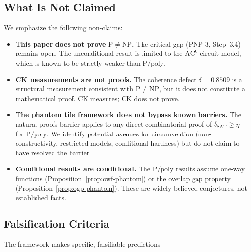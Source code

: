 \documentclass[11pt]{article}
\theoremstyle{definition}
\theoremstyle{remark}
\newcommand{\Ppoly}{\mathrm{P/poly}}
\newcommand{\ACz}{\mathrm{AC}^0}
\newcommand{\dSAT}{\delta_{\mathrm{SAT}}}
\begin{document}
\subsection{What Is Not Claimed}

We emphasize the following non-claims:

\begin{itemize}[nosep]
  \item \textbf{This paper does not prove $\mathrm{P} \neq \mathrm{NP}$.}
    The critical gap (PNP-3, Step~3.4) remains open.  The unconditional
    result is limited to the $\ACz$ circuit model, which is known to be
    strictly weaker than $\Ppoly$.

  \item \textbf{CK measurements are not proofs.}  The coherence defect
    $\delta = 0.8509$ is a structural measurement consistent with
    $\mathrm{P} \neq \mathrm{NP}$, but it does not constitute a
    mathematical proof.  CK measures; CK does not prove.

  \item \textbf{The phantom tile framework does not bypass known barriers.}
    The natural proofs barrier \cite{RR} applies to any direct
    combinatorial proof of $\dSAT \geq \eta$ for $\Ppoly$.  We identify
    potential avenues for circumvention (non-constructivity,
    restricted models, conditional hardness) but do not claim to have
    resolved the barrier.

  \item \textbf{Conditional results are conditional.}  The $\Ppoly$ results
    assume one-way functions (Proposition~\ref{prop:owf-phantom}) or the
    overlap gap property (Proposition~\ref{prop:ogp-phantom}).  These are
    widely-believed conjectures, not established facts.
\end{itemize}

\subsection{Falsification Criteria}

The framework makes specific, falsifiable predictions:
\end{document}
